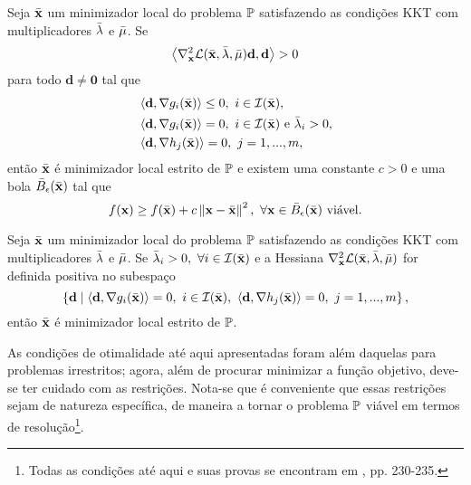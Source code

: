 \begin{theorem}
Seja $\bar{\mathbf{x}}$ um minimizador local do problema $\mathbb{P}$ satisfazendo as condi\c{c}\~{o}es KKT com multiplicadores $\bar{\mathbf{\lambda}}$ e $\bar{\mathbf{\mu}}$. Se 
\begin{equation}
\left\langle\nabla_{\mathbf{x}}^{2} \mathcal{L}(\bar{\mathbf{x}},\bar{\mathbf{\lambda}},\bar{\mathbf{\mu}})\mathbf{d},\mathbf{d}\right\rangle > 0
\end{equation}
para todo $\mathbf{d} \ne \mathbf{0}$ tal que
\begin{equation}
\begin{aligned}
&\left\langle\mathbf{d},\nabla g_i(\bar{\mathbf{x}})\right\rangle \le 0,~i \in \mathcal{I}(\bar{\mathbf{x}}), \\
&\left\langle\mathbf{d},\nabla g_i(\bar{\mathbf{x}})\right\rangle = 0,~i \in \mathcal{I}(\bar{\mathbf{x}}) \text{ e } \bar{\mathbf{\lambda}}_{i} > 0, \\
&\left\langle\mathbf{d},\nabla h_j(\bar{\mathbf{x}})\right\rangle = 0,~j = 1,...,m,
\end{aligned}
\end{equation}
ent\~{a}o $\bar{\mathbf{x}}$ \'{e} minimizador local estrito de $\mathbb{P}$ e existem uma constante $c > 0$ e uma bola $\bar{B}_{\epsilon}(\bar{\mathbf{x}})$ tal que
\begin{equation}
f(\mathbf{x}) \ge f(\bar{\mathbf{x}}) + c\left\lVert\mathbf{x} - \bar{\mathbf{x}}\right\rVert^{2},~\forall \mathbf{x} \in \bar{B}_{\epsilon}(\bar{\mathbf{x}}) \text{ vi\'{a}vel.}
\end{equation}
\end{theorem}

\begin{corollary}
Seja $\bar{\mathbf{x}}$ um minimizador local do problema $\mathbb{P}$ satisfazendo as condi\c{c}\~{o}es KKT com multiplicadores $\bar{\mathbf{\lambda}}$ e $\bar{\mathbf{\mu}}$. Se $\bar{\mathbf{\lambda}}_i > 0,~\forall i \in \mathcal{I}(\bar{\mathbf{x}})$ e a Hessiana $\nabla_{\mathbf{x}}^{2} \mathcal{L}(\bar{\mathbf{x}},\bar{\mathbf{\lambda}},\bar{\mathbf{\mu}})$ for definida positiva no subespa\c{c}o
\begin{equation*}
\left\lbrace\mathbf{d} \mid \left\langle\mathbf{d},\nabla g_i(\bar{\mathbf{x}})\right\rangle = 0,~i \in \mathcal{I}(\bar{\mathbf{x}}),~\left\langle\mathbf{d},\nabla h_j(\bar{\mathbf{x}})\right\rangle = 0,~j = 1,...,m\right\rbrace,
\end{equation*}
ent\~{a}o $\bar{\mathbf{x}}$ \'{e} minimizador local estrito de $\mathbb{P}$.
\end{corollary}

As condi\c{c}\~{o}es de otimalidade at\'{e} aqui apresentadas foram al\'{e}m daquelas para problemas irrestritos; agora, al\'{e}m de procurar minimizar a fun\c{c}\~{a}o objetivo, deve-se ter cuidado com as restri\c{c}\~{o}es. Nota-se que \'{e} conveniente que essas restri\c{c}\~{o}es sejam de natureza espec\'{i}fica, de maneira a tornar o problema $\mathbb{P}$ vi\'{a}vel em termos de resolu\c{c}\~{a}o\footnote{Todas as condi\c{c}\~{o}es at\'{e} aqui e suas provas se encontram em \cite{guller}, pp. 230-235.}.


